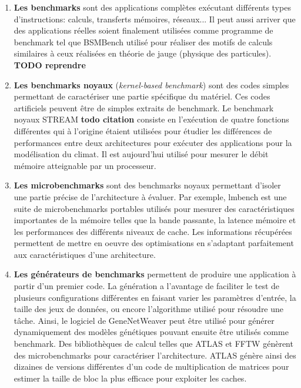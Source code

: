         \begin{enumerate}

            \item  \textbf{Les benchmarks} sont des applications complètes exécutant différents types d'instructions: calculs, transferts mémoires, réseaux... Il peut aussi arriver que des applications réelles soient finalement utilisées comme programme de benchmark tel que BSMBench \cite{Bennett2014} utilisé pour réaliser des motifs de calculs similaires à ceux réalisées en théorie de jauge (physique des particules). \textbf{TODO reprendre}
        
            \item  \textbf{Les benchmarks noyaux} (\textit{kernel-based benchmark}) sont des codes simples permettant de caractériser une partie spécifique du matériel. Ces codes artificiels peuvent être de simples extraits de benchmark. Le benchmark noyaux STREAM \textbf{todo citation} consiste en l'exécution de quatre fonctions différentes qui à l'origine étaient utilisées pour étudier les différences de performances entre deux architectures pour exécuter des applications pour la modélisation du climat. Il est aujourd'hui utilisé pour mesurer le débit mémoire atteignable par un processeur.
        
            \item \textbf{Les microbenchmarks} sont des benchmarks noyaux permettant d’isoler une partie précise de l’architecture à évaluer. Par exemple, lmbench \cite{Staelin2004} est une suite de microbenchmarks portables utilisés pour mesurer des caractéristiques importantes de la mémoire telles que la bande passante, la latence mémoire et les performances des différents niveaux de cache.  Les informations récupérées permettent de mettre en oeuvre des optimisations en s'adaptant parfaitement aux caractéristiques d'une architecture.
      
            \item \textbf{Les générateurs de benchmarks} permettent de produire une application à partir d'un premier code. La génération a l'avantage de faciliter le test de plusieurs configurations différentes en faisant varier les paramètres d'entrée, la taille des jeux de données, ou encore l'algorithme utilisé pour résoudre une tâche. Ainsi, le logiciel de GeneNetWeaver \cite{schaffter2011genenetweaver} peut être utilisé pour générer dynamiquement des modèles génétiques pouvant ensuite être utilisés comme benchmark. Des bibliothèques de calcul telles que ATLAS \cite{whaley1998automatically} et FFTW \cite{frigo1998fftw} génèrent des microbenchmarks pour caractériser l'architecture. ATLAS génère ainsi des dizaines de versions différentes d'un code de multiplication de matrices pour estimer la taille de bloc la plus efficace pour exploiter les caches.
        \end{enumerate}    
   
